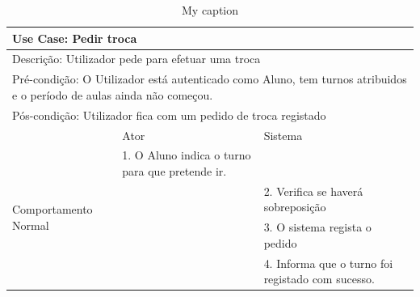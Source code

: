 \documentclass[12pt,a4paper]{report}
\begin{document}
\begin{table}[h]
\centering
\caption{My caption}
\label{my-label}
\begin{tabular}{|m{}|m{}|m{}|}
\hline
\multicolumn{3}{|m{\textwidth}|}{Use Case: Pedir troca}                                                                                                                                                                                            \\ \hline
\multicolumn{3}{|m{\textwidth}|}{Descrição: Utilizador pede para efetuar uma troca}                                                                                                                                                                \\ \hline
\multicolumn{3}{|m{\textwidth}|}{Pré-condição: O Utilizador está autenticado como Aluno, tem turnos atribuidos e o período de aulas ainda não começou.}                                                                                            \\ \hline
\multicolumn{3}{|m{\textwidth}|}{Pós-condição: Utilizador fica com um pedido de troca registado}                                                                                                                                                   \\ \hline
                                                                                                                                 & Ator                                            & Sistema                                           \\ \hline
\multirow{4}{*}{Comportamento Normal}                                                                                            & 1. O Aluno indica o turno para que pretende ir. &                                                   \\ \cline{2-3} 
                                                                                                                                 &                                                 & 2. Verifica se haverá sobreposição                \\ \cline{2-3} 
                                                                                                                                 &                                                 & 3. O sistema regista o pedido                     \\ \cline{2-3} 
                                                                                                                                 &                                                 & 4. Informa que o turno foi registado com sucesso. \\ \hline

\end{tabular}
\end{table}
\end{document}
